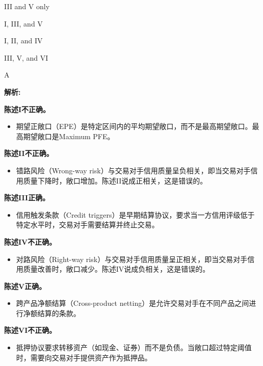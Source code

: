 \documentclass{article}
\newenvironment{explanation}
{\textbf{解析:}\par}
{\par}
\begin{document}
\begin{choices}
    \item III and V only
    \item I, III, and V
    \item I, II, and IV
    \item III, V, and VI
\end{choices}

\begin{correctanswer}
    A
\end{correctanswer}

\begin{explanation}
    \textbf{陈述I不正确。}
    \begin{itemize}
        \item 期望正敞口（EPE）是特定区间内的平均期望敞口，而不是最高期望敞口。最高期望敞口是Maximum PFE。
    \end{itemize}

    \textbf{陈述II不正确。}
    \begin{itemize}
        \item 错路风险（Wrong-way risk）与交易对手信用质量呈负相关，即当交易对手信用质量下降时，敞口增加。陈述II说成正相关，这是错误的。
    \end{itemize}

    \textbf{陈述III正确。}
    \begin{itemize}
        \item 信用触发条款（Credit triggers）是早期结算协议，要求当一方信用评级低于特定水平时，交易对手需要结算并终止交易。
    \end{itemize}

    \textbf{陈述IV不正确。}
    \begin{itemize}
        \item 对路风险（Right-way risk）与交易对手信用质量呈正相关，即当交易对手信用质量改善时，敞口减少。陈述IV说成负相关，这是错误的。
    \end{itemize}

    \textbf{陈述V正确。}
    \begin{itemize}
        \item 跨产品净额结算（Cross-product netting）是允许交易对手在不同产品之间进行净额结算的条款。
    \end{itemize}

    \textbf{陈述VI不正确。}
    \begin{itemize}
        \item 抵押协议要求转移资产（如现金、证券）而不是负债。当敞口超过特定阈值时，需要向交易对手提供资产作为抵押品。
    \end{itemize}

\end{explanation}
\end{document}
